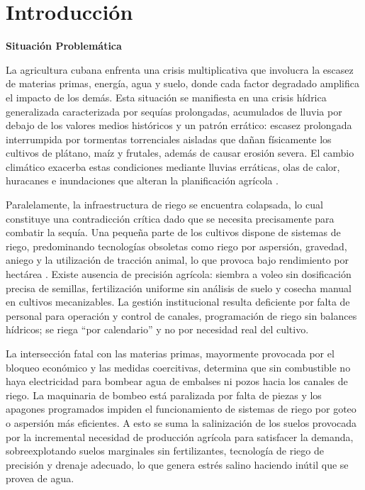 \chapter*{Introducción}

\noindent\textbf{Situación Problemática}

\noindent La agricultura cubana enfrenta una crisis multiplicativa que involucra la escasez de materias primas, energía, agua y suelo, donde cada factor degradado amplifica el impacto de los demás. Esta situación se manifiesta en una crisis hídrica generalizada caracterizada por sequías prolongadas, acumulados de lluvia por debajo de los valores medios históricos y un patrón errático: escasez prolongada interrumpida por tormentas torrenciales aisladas que dañan físicamente los cultivos de plátano, maíz y frutales, además de causar erosión severa. El cambio climático exacerba estas condiciones mediante lluvias erráticas, olas de calor, huracanes e inundaciones que alteran la planificación agrícola \citep{cigg2025}.

Paralelamente, la infraestructura de riego se encuentra colapsada, lo cual constituye una contradicción crítica dado que se necesita precisamente para combatir la sequía. Una pequeña parte de los cultivos dispone de sistemas de riego, predominando tecnologías obsoletas como riego por aspersión, gravedad, aniego y la utilización de tracción animal, lo que provoca bajo rendimiento por hectárea \citep{cornelltraccion}. Existe ausencia de precisión agrícola: siembra a voleo sin dosificación precisa de semillas, fertilización uniforme sin análisis de suelo y cosecha manual en cultivos mecanizables. La gestión institucional resulta deficiente por falta de personal para operación y control de canales, programación de riego sin balances hídricos; se riega ``por calendario'' y no por necesidad real del cultivo.

La intersección fatal con las materias primas, mayormente provocada por el bloqueo económico y las medidas coercitivas, determina que sin combustible no haya electricidad para bombear agua de embalses ni pozos hacia los canales de riego. La maquinaria de bombeo está paralizada por falta de piezas y los apagones programados impiden el funcionamiento de sistemas de riego por goteo o aspersión más eficientes. A esto se suma la salinización de los suelos provocada por la incremental necesidad de producción agrícola para satisfacer la demanda, sobreexplotando suelos marginales sin fertilizantes, tecnología de riego de precisión y drenaje adecuado, lo que genera estrés salino haciendo inútil que se provea de agua.

